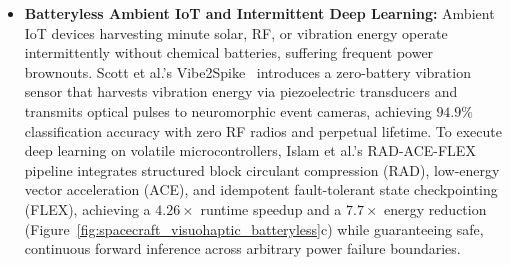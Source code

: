 \begin{itemize}
    \item \textbf{Batteryless Ambient IoT and Intermittent Deep Learning:} Ambient IoT devices harvesting minute solar, RF, or vibration energy operate intermittently without chemical batteries, suffering frequent power brownouts. Scott et al.'s Vibe2Spike~\cite{Scott2025Vibe2Spike} introduces a zero-battery vibration sensor that harvests vibration energy via piezoelectric transducers and transmits optical pulses to neuromorphic event cameras, achieving $94.9\%$ classification accuracy with zero RF radios and perpetual lifetime. To execute deep learning on volatile microcontrollers, Islam et al.'s RAD-ACE-FLEX~\cite{Islam2021FastDL} pipeline integrates structured block circulant compression (RAD), low-energy vector acceleration (ACE), and idempotent fault-tolerant state checkpointing (FLEX), achieving a $4.26\times$ runtime speedup and a $7.7\times$ energy reduction (Figure~\ref{fig:spacecraft_visuohaptic_batteryless}c) while guaranteeing safe, continuous forward inference across arbitrary power failure boundaries.
\end{itemize}

